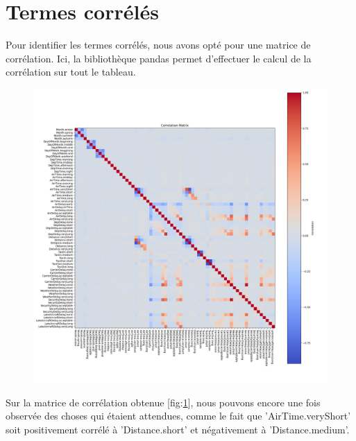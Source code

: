 \section{Termes corrélés}
  Pour identifier les termes corrélés, nous avons opté pour une matrice de corrélation.
  Ici, la bibliothèque pandas permet d'effectuer le calcul de la corrélation sur tout le tableau.

\begin{figure}[H]
  \centering
  \includegraphics[scale=0.45]{images/correlation_matrix.png}
  \caption{}
  \label{fig:correlation}
\end{figure}

Sur la matrice de corrélation obtenue [fig:\ref{fig:correlation}], nous pouvons encore une fois observée des choses qui étaient attendues, comme le fait que 'AirTime.veryShort' soit positivement corrélé à 'Distance.short' et négativement à 'Distance.medium'.
